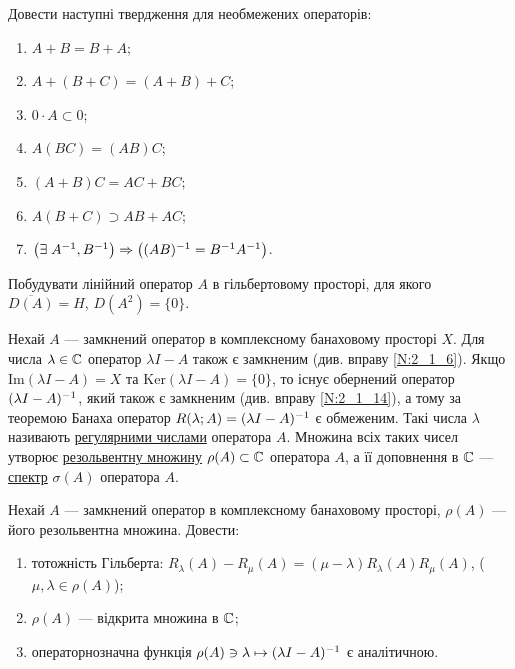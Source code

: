
\begin{exercise}
    Довести наступні твердження для необмежених операторів:
    \begin{enumerate}
        \item $A + B = B + A$;
        \item $A + (B + C) = (A + B) + C$;
        \item $0 \cdot A \subset 0$;
        \item $A(BC) = (AB)C$;
        \item $(A+B)C = AC + BC$;
        \item $A(B+C) \supset AB + AC$;
        \item $\left( \exists \; A^{-1}, B^{-1} \right)  \Rightarrow 
               \left( (AB)^{-1} = B^{-1}A^{-1} \right)$.
    \end{enumerate}
\end{exercise}

\begin{exercise}
    Побудувати лінійний оператор $A$ в гільбертовому просторі, для якого $\overline{D(A)} = H$,
    $D(A^2) = \{0\}$.
\end{exercise}

\begin{theory}
    Нехай $A$ --- замкнений оператор в комплексному банаховому просторі $X$.
    Для числа $\lambda \in \mathbb{C}$ оператор $\lambda I - A$ також є замкненим
    (див. вправу \ref{N:2_1_6}). Якщо $\mathrm{Im}(\lambda I - A) = X$ та 
    $\mathrm{Ker}(\lambda I - A) = \{0\}$, то існує обернений оператор $(\lambda I - A)^{-1}$,
    який також є замкненим (див. вправу \ref{N:2_1_14}), а тому за теоремою Банаха оператор
    $R(\lambda; A) = (\lambda I - A)^{-1}$ є обмеженим. Такі числа $\lambda$ називають
    \ul{регулярними числами} оператора $A$. Множина всіх таких чисел утворює 
    \ul{резольвентну множину} $\rho(A) \subset \mathbb{C}$ оператора $A$, а її доповнення
    в $\mathbb{C}$ --- \ul{спектр} $\sigma(A)$ оператора $A$.
\end{theory}

\begin{exercise}
    Нехай $A$ --- замкнений оператор в комплексному банаховому просторі, $\rho(A)$ --- його
    резольвентна множина. Довести:
    \begin{enumerate}
        \item тотожність Гільберта: $R_\lambda(A) - R_\mu(A) = (\mu - \lambda) R_\lambda(A)R_\mu(A)$,
        ($\mu, \lambda \in \rho(A)$);
        \item $\rho(A)$ --- відкрита множина в $\mathbb{C}$;
        \item операторнозначна функція $\rho(A) \ni \lambda \mapsto (\lambda I - A)^{-1}$ є аналітичною.
    \end{enumerate}
\end{exercise}

